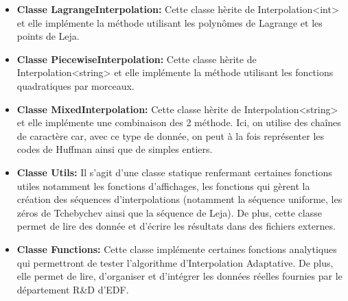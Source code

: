\begin{itemize}
\item \textbf{Classe LagrangeInterpolation:} Cette classe hèrite de Interpolation<int> et elle implémente la méthode utilisant les polynômes de Lagrange et les points de Leja.

\item \textbf{Classe PiecewiseInterpolation:} Cette classe hèrite de Interpolation<string> et elle implémente la méthode utilisant les fonctions quadratiques par morceaux.

\item \textbf{Classe MixedInterpolation:} Cette classe hèrite de Interpolation<string> et elle implémente une combinaison des 2 méthode. Ici, on utilise des chaînes de caractère
car, avec ce type de donnée, on peut à la fois représenter les codes de Huffman ainsi que de simples entiers.

\item \textbf{Classe Utils:} Il s'agit d'une classe statique renfermant certaines fonctions utiles notamment les fonctions d'affichages,
les fonctions qui gèrent la création des séquences d'interpolations (notamment la séquence uniforme, les zéros de Tchebychev ainsi que la séquence de Leja).
De plus, cette classe permet de lire des donnée et d'écrire les résultats dans des fichiers externes.

\item \textbf{Classe Functions:}
Cette classe implémente certaines fonctions analytiques qui permettront de tester l'algorithme d'Interpolation Adaptative. De plus, elle permet de lire, d'organiser
et d'intégrer les données réelles fournies par le département R\&D d'EDF.
\end{itemize}


